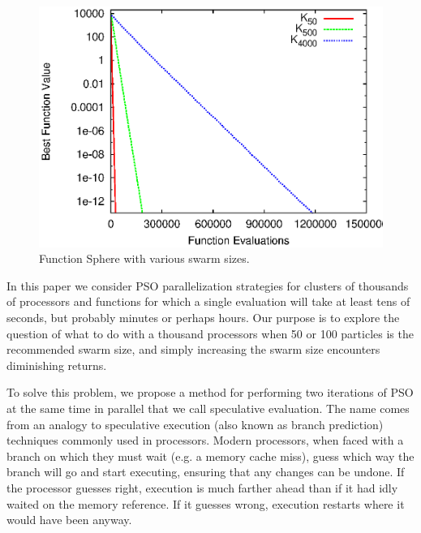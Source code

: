 \documentclass[journal,letterpaper]{IEEEtran}
\begin{document}
\begin{figure}
  \centering
  \includegraphics[width=.8\columnwidth]{evals_sphere}
  \caption{Function Sphere with various swarm sizes.}
  \label{fig:evals-sphere}
\end{figure}

In this paper we consider PSO parallelization strategies for clusters of
thousands of processors and functions for which a single evaluation will take
at least tens of seconds, but probably minutes or perhaps hours.  Our purpose
is to explore the question of what to do with a thousand processors when 50 or
100 particles is the recommended swarm size, and simply increasing the swarm
size encounters diminishing returns.

To solve this problem, we propose a method for performing two iterations of PSO
at the same time in parallel that we call speculative evaluation.  The name
comes from an analogy to speculative execution (also known as branch
prediction) techniques commonly used in processors.  Modern processors, when
faced with a branch on which they must wait (e.g. a memory cache miss), guess
which way the branch will go and start executing, ensuring that any changes
can be undone.  If the processor guesses right, execution is
much farther ahead than if it had idly waited on the memory reference.  If
it guesses wrong, execution restarts where it would have been anyway.  
\end{document}
